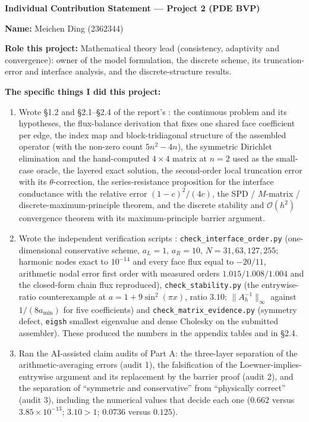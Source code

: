 \begin{formbox}
\textbf{Individual Contribution Statement --- Project 2 (PDE BVP)}

\textbf{Name:} Meichen Ding (2362344)

\textbf{Role this project:} Mathematical theory lead (consistency, adaptivity
and convergence): owner of the model formulation, the discrete scheme, its
truncation-error and interface analysis, and the discrete-structure results.

\textbf{The specific things I did this project:}
\begin{enumerate}[leftmargin=1.4em,itemsep=0.15em]
  \item
  Wrote \S1.2 and \S2.1--\S2.4 of the report's : the continuous
  problem and its hypotheses, the flux-balance derivation that fixes
  one shared face coefficient per edge, the index map and block-tridiagonal
  structure of the assembled operator (with the non-zero count $5n^2-4n$), the
  symmetric Dirichlet elimination and the hand-computed $4\times4$ matrix at
  $n=2$ used as the small-case oracle, the layered exact solution, the
  second-order local truncation error with its $\theta$-correction, the
  series-resistance proposition for the interface conductance with the relative
  error $(1-c)^2/(4c)$, the SPD / $M$-matrix / discrete-maximum-principle
  theorem, and the discrete stability and $\mathcal{O}(h^2)$ convergence theorem
  with its maximum-principle barrier argument.
  \item
  Wrote the independent verification scripts :
  \texttt{check\_interface\_order.py} (one-dimensional conservative scheme,
  $a_L=1$, $a_R=10$, $N=31,63,127,255$; harmonic nodes exact to $10^{-14}$ and
  every face flux equal to $-20/11$, arithmetic nodal error first order with
  measured orders $1.015/1.008/1.004$ and the closed-form chain flux
  reproduced), \texttt{check\_stability.py} (the entrywise-ratio counterexample
  at $a=1+9\sin^2(\pi x)$, ratio $3.10$; $\|A_h^{-1}\|_\infty$ against
  $1/(8a_{\min})$ for five coefficients) and
  \texttt{check\_matrix\_evidence.py} (symmetry defect, \texttt{eigsh} smallest
  eigenvalue and dense Cholesky on the submitted assembler). These produced the
  numbers in the appendix tables and in \S2.4.
  \item
  Ran the AI-assisted claim audits of Part A: the three-layer separation of the
  arithmetic-averaging errors (audit 1), the falsification of the
  Loewner-implies-entrywise argument and its replacement by the barrier proof
  (audit 2), and the separation of ``symmetric and conservative'' from
  ``physically correct'' (audit 3), including the numerical values that decide
  each one ($0.662$ versus $3.85\times10^{-13}$; $3.10>1$; $0.0736$ versus
  $0.125$).
\end{enumerate}


\end{formbox}
